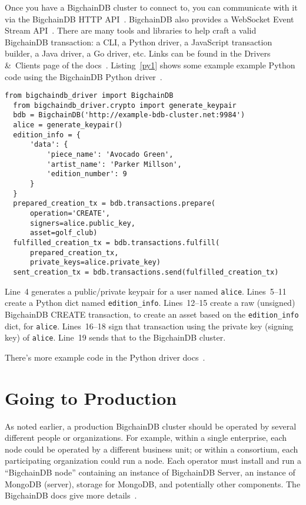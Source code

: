 \documentclass[a4paper]{article}
\begin{document}
Once you have a BigchainDB cluster to connect to,
you can communicate with it via the BigchainDB HTTP API~\cite{bigchaindb_http_api}.
BigchainDB also provides a WebSocket Event Stream API~\cite{bigchaindb_websocket_api}.
There are many tools and libraries to help craft a valid BigchainDB transaction:
a CLI, a Python driver, a JavaScript transaction builder, a Java driver, a Go driver, etc.
Links can be found in the Drivers \&~Clients page
of the docs~\cite{bigchaindb_drivers_clients}.
Listing~\ref{py1} shows some example example Python code
using the BigchainDB Python driver~\cite{bigchaindb_python_driver}.


\begin{minipage}{\linewidth}
  \begin{lstlisting}[caption={Example Code Using the Python Driver}, label={py1}, style=python]
  from bigchaindb_driver import BigchainDB
  from bigchaindb_driver.crypto import generate_keypair
  bdb = BigchainDB('http://example-bdb-cluster.net:9984')
  alice = generate_keypair()
  edition_info = {
      'data': {
          'piece_name': 'Avocado Green',
          'artist_name': 'Parker Millson',
          'edition_number': 9
      }
  }
  prepared_creation_tx = bdb.transactions.prepare(
      operation='CREATE',
      signers=alice.public_key,
      asset=golf_club)
  fulfilled_creation_tx = bdb.transactions.fulfill(
      prepared_creation_tx,
      private_keys=alice.private_key)
  sent_creation_tx = bdb.transactions.send(fulfilled_creation_tx)\end{lstlisting}
\end{minipage}

\medskip

Line~4 generates a public/private keypair for a user named \texttt{alice}.
Lines~5--11 create a Python dict named \texttt{edition\_info}.
Lines~12--15 create a raw (unsigned) BigchainDB CREATE transaction,
to create an asset based on the \texttt{edition\_info} dict, for \texttt{alice}.
Lines~16--18 sign that transaction using the private key (signing key)
of \texttt{alice}. Line~19 sends that to the BigchainDB cluster.

There's more example code
in the Python driver docs~\cite{bigchaindb_python_driver}.


\section{Going to Production}

As noted earlier, a production BigchainDB cluster should be operated
by several different people or organizations.
For example, within a single enterprise,
each node could be operated by a different business unit;
or within a consortium, each participating organization could run a node.
Each operator must install and run a ``BigchainDB node''
containing an instance of BigchainDB Server,
an instance of MongoDB (server),
storage for MongoDB,
and potentially other components.
The BigchainDB docs give more details~\cite{bigchaindb_prod_nodes}.
\end{document}
